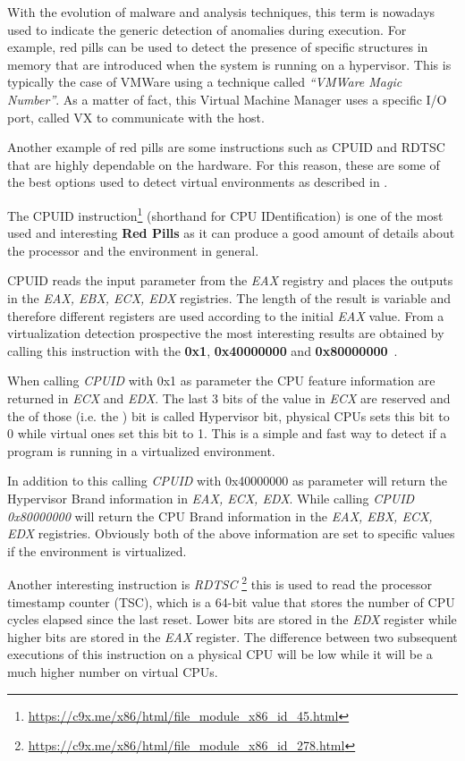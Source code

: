 With the evolution of malware and analysis techniques, this term is nowadays used to indicate the generic detection of anomalies during execution. For example, red pills can be used to detect the presence of specific structures in memory that are introduced when the system is running on a hypervisor. This is typically the case of VMWare using a technique called \textit{“VMWare Magic Number”}. As a matter of fact, this Virtual Machine Manager uses a specific I/O port, called VX to communicate with the host. 

Another example of red pills are some instructions such as CPUID and RDTSC that are highly dependable on the hardware. For this reason, these are some of the best options used to detect virtual environments as described in \cite{hwvirt}.

The CPUID instruction\footnote{\url{https://c9x.me/x86/html/file_module_x86_id_45.html}} (shorthand for CPU IDentification) is one of the most used and interesting \textbf{Red Pills} as it can produce a good amount of details about the processor and the environment in general.

CPUID reads the input parameter from the \textit{EAX} registry and places the outputs in the \textit{EAX, EBX, ECX, EDX} registries. The length of the result is variable and therefore different registers are used according to the initial \textit{EAX} value. From a virtualization detection prospective the most interesting results are obtained by calling this instruction with the \textbf{0x1}, \textbf{0x40000000} and \textbf{0x80000000}~\cite{CPUID}. 

When calling \textit{CPUID} with 0x1 as parameter the CPU feature information are returned in \textit{ECX} and \textit{EDX}. The last 3 bits of the value in \textit{ECX} are reserved and the  of those (i.e. the ) bit is called Hypervisor bit, physical CPUs sets this bit to 0 while virtual ones set this bit to 1. This is a simple and fast way to detect if a program is running in a virtualized environment. 

In addition to this calling \textit{CPUID} with 0x40000000 as parameter will return the Hypervisor Brand information in \textit{EAX, ECX, EDX}. While calling \textit{CPUID 0x80000000} will return the CPU Brand information in the \textit{EAX, EBX, ECX, EDX} registries. Obviously both of the above information are set to specific values if the environment is virtualized. 

Another interesting instruction is \textit{RDTSC} \footnote{\url{https://c9x.me/x86/html/file_module_x86_id_278.html}} this is used to read the processor timestamp counter (TSC), which is a 64-bit value that stores the number of CPU cycles elapsed since the last reset. Lower bits are stored in the \textit{EDX} register while higher bits are stored in the \textit{EAX} register. The difference between two subsequent executions of this instruction on a physical CPU will be low while it will be a much higher number on virtual CPUs.


